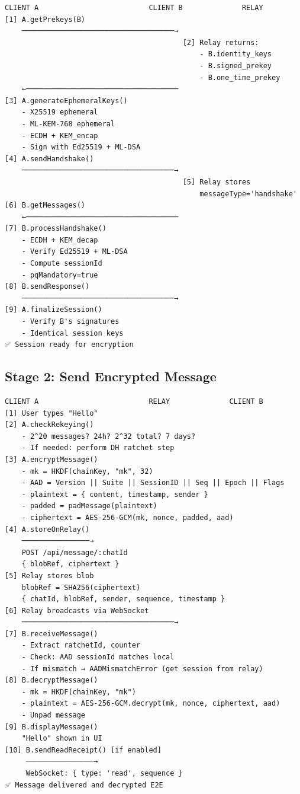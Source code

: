 \documentclass[11pt,a4paper,oneside]{book}
\begin{document}
\begin{verbatim}
CLIENT A                          CLIENT B              RELAY
[1] A.getPrekeys(B)
    ────────────────────────────────────→
                                          [2] Relay returns:
                                              - B.identity_keys
                                              - B.signed_prekey
                                              - B.one_time_prekey
    ←────────────────────────────────────
[3] A.generateEphemeralKeys()
    - X25519 ephemeral
    - ML-KEM-768 ephemeral
    - ECDH + KEM_encap
    - Sign with Ed25519 + ML-DSA
[4] A.sendHandshake()
    ────────────────────────────────────→
                                          [5] Relay stores
                                              messageType='handshake'
[6] B.getMessages()
    ←────────────────────────────────────
[7] B.processHandshake()
    - ECDH + KEM_decap
    - Verify Ed25519 + ML-DSA
    - Compute sessionId
    - pqMandatory=true
[8] B.sendResponse()
    ────────────────────────────────────→
[9] A.finalizeSession()
    - Verify B's signatures
    - Identical session keys
✅ Session ready for encryption
\end{verbatim}
\vspace{-0.2cm}\subsection{Stage 2: Send Encrypted Message}
\begin{verbatim}
CLIENT A                          RELAY              CLIENT B
[1] User types "Hello"
[2] A.checkRekeying()
    - 2^20 messages? 24h? 2^32 total? 7 days?
    - If needed: perform DH ratchet step
[3] A.encryptMessage()
    - mk = HKDF(chainKey, "mk", 32)
    - AAD = Version || Suite || SessionID || Seq || Epoch || Flags
    - plaintext = { content, timestamp, sender }
    - padded = padMessage(plaintext)
    - ciphertext = AES-256-GCM(mk, nonce, padded, aad)
[4] A.storeOnRelay()
    ────────────────→
    POST /api/message/:chatId
    { blobRef, ciphertext }
[5] Relay stores blob
    blobRef = SHA256(ciphertext)
    { chatId, blobRef, sender, sequence, timestamp }
[6] Relay broadcasts via WebSocket
    ────────────────────────────────────→
[7] B.receiveMessage()
    - Extract ratchetId, counter
    - Check: AAD sessionId matches local
    - If mismatch → AADMismatchError (get session from relay)
[8] B.decryptMessage()
    - mk = HKDF(chainKey, "mk")
    - plaintext = AES-256-GCM.decrypt(mk, nonce, ciphertext, aad)
    - Unpad message
[9] B.displayMessage()
    "Hello" shown in UI
[10] B.sendReadReceipt() [if enabled]
     ────────────────→
     WebSocket: { type: 'read', sequence }
✅ Message delivered and decrypted E2E
\end{verbatim}
\end{document}
